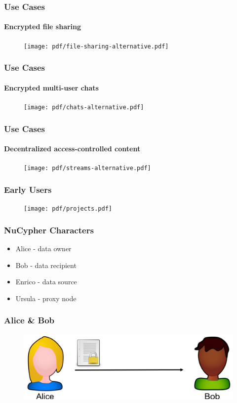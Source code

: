 \documentclass[xetex,mathsans,sans,aspectratio=169]{beamer}
\begin{document}
    \begin{frame}
        \frametitle{Use Cases}
        \framesubtitle{Encrypted file sharing}
        \begin{figure}
            \centering
            \texttt{[image: pdf/file-sharing-alternative.pdf]}
        \end{figure}
    \end{frame}

    \begin{frame}
        \frametitle{Use Cases}
        \framesubtitle{Encrypted multi-user chats}
        \begin{figure}
            \centering
            \texttt{[image: pdf/chats-alternative.pdf]}
        \end{figure}
    \end{frame}

    \begin{frame}
        \frametitle{Use Cases}
        \framesubtitle{Decentralized access-controlled content}
        \begin{figure}
            \centering
            \texttt{[image: pdf/streams-alternative.pdf]}
        \end{figure}
    \end{frame}

    \begin{frame}
      \frametitle{Early Users}
      \begin{figure}
           \texttt{[image: pdf/projects.pdf]}
      \end{figure}
    \end{frame}
    
    \begin{frame}
      \frametitle{NuCypher Characters}
      \begin{itemize}
        \setlength\itemsep{1em}
        \item Alice  - data owner
        \item Bob    - data recipient
        \item Enrico - data source
        \item Ursula - proxy node
      \end{itemize}
    \end{frame}

    \begin{frame}
      \frametitle{Alice \& Bob}
      \begin{figure}
        \centering
        \includegraphics[height=3.5cm]{pdf/alice_and_bob.png}
      \end{figure}
    \end{frame}
\end{document}
